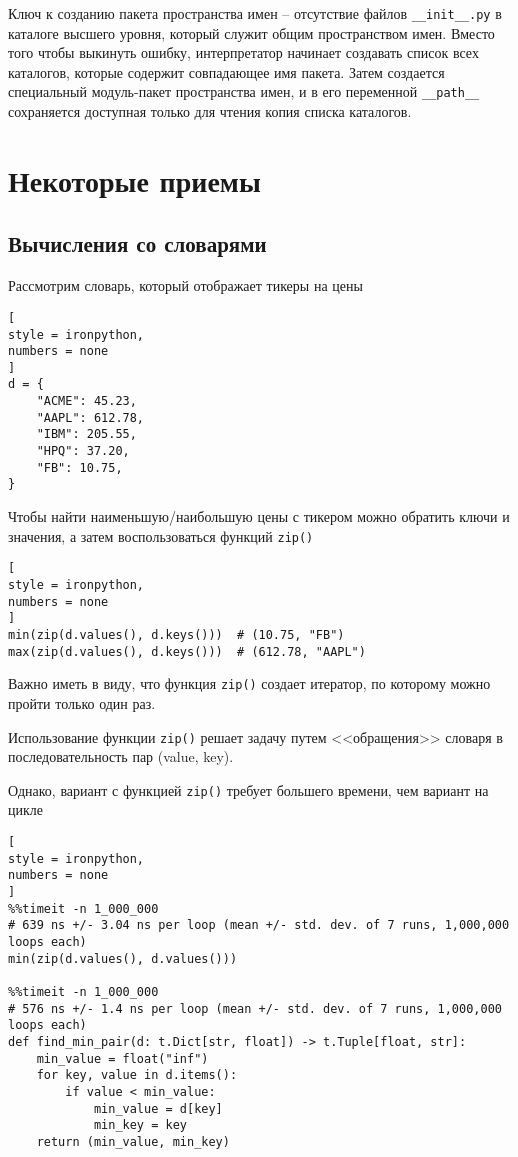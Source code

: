 \documentclass[%
	11pt,
	a4paper,
	utf8,
		]{article}
\begin{document}
Ключ к созданию пакета пространства имен -- отсутствие файлов \verb|__init__.py| в каталоге высшего уровня, который служит общим пространством имен. Вместо того чтобы выкинуть ошибку, интерпретатор начинает создавать список всех каталогов, которые содержит совпадающее имя пакета. Затем создается специальный модуль-пакет пространства имен, и в его переменной \verb|__path__| сохраняется доступная только для чтения копия списка каталогов.





\section{Некоторые приемы}

\subsection{Вычисления со словарями}

Рассмотрим словарь, который отображает тикеры на цены
\begin{lstlisting}[
style = ironpython,
numbers = none
]
d = {
    "ACME": 45.23,
    "AAPL": 612.78,
    "IBM": 205.55,
    "HPQ": 37.20,
    "FB": 10.75,
}
\end{lstlisting}

Чтобы найти наименьшую/наибольшую цены с тикером можно обратить ключи и значения, а затем воспользоваться функций \texttt{zip()}
\begin{lstlisting}[
style = ironpython,
numbers = none
]
min(zip(d.values(), d.keys()))  # (10.75, "FB")
max(zip(d.values(), d.keys()))  # (612.78, "AAPL")
\end{lstlisting}

Важно иметь в виду, что функция \texttt{zip()} создает итератор, по которому можно пройти только один раз.

Использование функции \texttt{zip()} решает задачу путем <<обращения>> словаря в последовательность пар (value, key). 

Однако, вариант с функцией \texttt{zip()} требует большего времени, чем вариант на цикле
\begin{lstlisting}[
style = ironpython,
numbers = none
]
%%timeit -n 1_000_000
# 639 ns +/- 3.04 ns per loop (mean +/- std. dev. of 7 runs, 1,000,000 loops each)
min(zip(d.values(), d.values()))  

%%timeit -n 1_000_000
# 576 ns +/- 1.4 ns per loop (mean +/- std. dev. of 7 runs, 1,000,000 loops each)
def find_min_pair(d: t.Dict[str, float]) -> t.Tuple[float, str]:
    min_value = float("inf")
    for key, value in d.items():
        if value < min_value:
            min_value = d[key]
            min_key = key
    return (min_value, min_key)
\end{lstlisting} 
\end{document}

